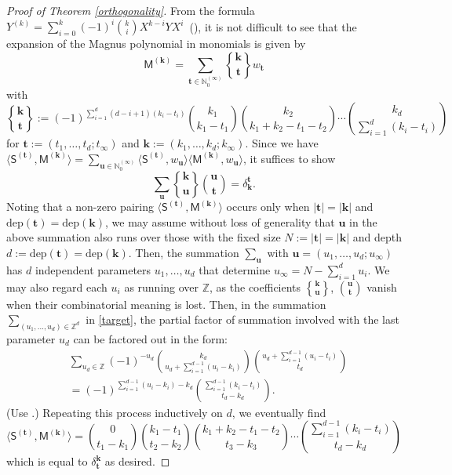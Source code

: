 \documentclass[ALCO,Unicode,published]{cedram}
\DeclareRobustCommand{\magnus}{\genfrac\{\}{0pt}{}}
\def\bk{{\mathbf{k}}}
\def\MM{{\mathsf{M}}}
\def\SS{{\mathsf{S}}}
\def\dep{\mathrm{dep}}
\def\bt{{\mathbf{t}}}
\def\bu{{\mathbf{u}}}
\def\lp{\langle}
\def\rp{\rangle}
\def\N{{\mathbb N}}
\def\Z{{\mathbb Z}}
\begin{document}
\begin{proof}[Proof of Theorem \ref{orthogonality}]
From the formula~$Y^{(k)}=\sum_{i=0}^k (-1)^i\binom{k}{i}X^{k-i}YX^i$~(\cite[(4)]{M37}), 
it is not difficult to see that the expansion of the Magnus polynomial in monomials
is given by 
\begin{equation} \label{Mag-Mono}
\MM^{(\bk)}=\sum_{\bt \in\N_0^{(\infty)}}
\magnus{\bk}{\bt} w_{\bt} 
\end{equation}
with
\begin{equation}
\label{MagnusBino}
\magnus{\bk}{\bt}:=(-1)^{\sum_{i=1}^d (d-i+1)(k_i-t_i)}
\binom{k_1}{k_1-t_1} 
\binom{k_2}{k_1+k_2-t_1-t_2} \cdots
\binom{k_d}{\sum_{i=1}^d(k_i-t_i)}
\end{equation}
for $\bt:=(t_1,\dots, t_d;t_\infty)$ and $\bk:=(k_1,\dots,k_d;k_\infty)$.
Since we have $\lp\SS^{(\bt)},\MM^{(\bk)}\rp=\sum_{\bu\in\N_0^{(\infty)}}
\lp\SS^{(\bt)},w_\bu\rp \lp\MM^{(\bk)},w_\bu\rp$, it suffices to show
\begin{equation} \label{target}
\sum_\bu \magnus{\bk}{\bu} \binom{\bu}{\bt}=\delta_\bk^\bt.
\end{equation}
Noting that a non-zero pairing $\lp\SS^{(\bt)},\MM^{(\bk)}\rp$ occurs only when
$|\bt|=|\bk|$ and $\dep(\bt)=\dep(\bk)$, we may assume without loss of generality 
that $\bu$ in the above summation also runs over those
with the fixed size $N:=|\bt|=|\bk|$ and depth $d:=\dep(\bt)=\dep(\bk)$.
Then, the summation $\sum_\bu$ with $\bu=(u_1,\dots,u_d;u_\infty)$ 
has $d$ independent parameters $u_1,\dots, u_d$ that determine 
$u_\infty=N-\sum_{i=1}^d u_i$. We may also regard each $u_i$ as running over $\Z$,
as the coefficients $\magnus{\bk}{\bu}$, $\binom{\bu}{\bt}$ vanish when 
their combinatorial meaning is lost.
Then, in the summation $\sum_{(u_1,\dots,u_d)\in\Z^d}$ in \eqref{target},
the partial factor of summation 
involved with the last parameter $u_d$ can be factored out in the form:
\begin{align*}
&
\sum_{u_d\in\Z}(-1)^{-u_d}
\binom{k_d}{u_d+\sum_{i=1}^{d-1}(u_i-k_i)}
\binom{u_d+\sum_{i=1}^{d-1}(u_i-t_i)}{t_d} \\
&=
(-1)^{\sum_{i=1}^{d-1}(u_i-k_i)-k_d}
\binom{\sum_{i=1}^{d-1}(k_i-t_i)}{t_d-k_d}.
\end{align*}
(Use \cite[(5.24)]{GKP}.)
Repeating this process inductively on $d$, we eventually find
$$
\lp\SS^{(\bt)},\MM^{(\bk)}\rp=
\binom{0}{t_1-k_1}
\binom{k_1-t_1}{t_2-k_2}
\binom{k_1+k_2-t_1-t_2}{t_3-k_3}
\cdots
\binom{\sum_{i=1}^{d-1}(k_i-t_i)}{t_d-k_d}
$$
which is equal to $\delta^\bk_\bt$ as desired.
\end{proof}
\end{document}
